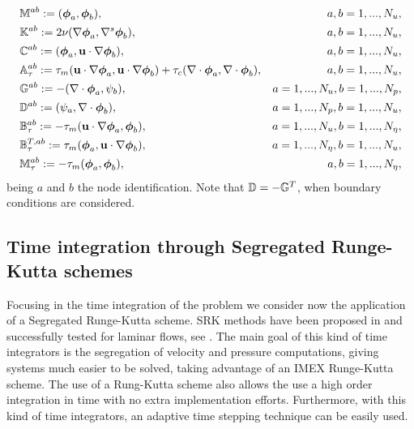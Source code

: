 \begin{align*}
&\mathbb{M}^{ab}:=(\boldsymbol{\phi}_{a},\boldsymbol{\phi}_{b}),&a,b=1,...,N_u,\\
&\mathbb{K}^{ab}:=2\nu(\nabla\boldsymbol{\phi}_{a},\nabla^s\boldsymbol{\phi}_{b}),&a,b=1,...,N_u,\\
&\mathbb{C}^{ab}:=(\boldsymbol{\phi}_{a},{\bf u}\cdot\nabla\boldsymbol{\phi}_{b}),&a,b=1,...,N_u,\\
&\mathbb{A}_{\tau}^{ab}:=\tau_m({\bf u}\cdot\nabla\boldsymbol{\phi}_{a},{\bf u}\cdot\nabla\boldsymbol{\phi}_{b})+\tau_c(\nabla\cdot\boldsymbol{\phi}_{a},\nabla\cdot\boldsymbol{\phi}_{b}),&a,b=1,...,N_u,\\
&\mathbb{G}^{ab}:=-(\nabla\cdot\boldsymbol{\phi}_{a},\psi_{b}),&a=1,...,N_u,b=1,...,N_p,\\
&\mathbb{D}^{ab}:=(\psi_{a},\nabla\cdot\boldsymbol{\phi}_{b}),&a=1,...,N_p,b=1,...,N_u,\\
&\mathbb{B}_{\tau}^{ab}:=-\tau_m({\bf u}\cdot\nabla\boldsymbol{\phi}_{a},\boldsymbol{\phi}_{b}),&a=1,...,N_u,b=1,...,N_\eta,\\
&\mathbb{B}_{\tau}^{T,ab}:=\tau_m(\boldsymbol{\phi}_{a},{\bf u}\cdot\nabla\boldsymbol{\phi}_{b}),&a=1,...,N_\eta,b=1,...,N_u,\\
&\mathbb{M}_{\tau}^{ab}:=-\tau_m(\boldsymbol{\phi}_{a},\boldsymbol{\phi}_{b}),&a,b=1,...,N_\eta,
\end{align*}
being $a$ and $b$ the node identification. Note that $\mathbb{D}=-\mathbb{G}^T$, when boundary conditions are considered.

\subsection{Time integration through Segregated Runge-Kutta schemes}
\label{subsec:C7_SRK}
Focusing in the time integration of the problem  we consider now the application of a Segregated Runge-Kutta scheme. SRK methods have been proposed in \cite{colomes_segregated_2015} and successfully tested for laminar flows, see . The main goal of this kind of time integrators is the segregation of velocity and pressure computations, giving systems much easier to be solved, taking advantage of an IMEX Runge-Kutta scheme. The use of a Rung-Kutta scheme also allows the use a high order integration in time with no extra implementation efforts. Furthermore, with this kind of time integrators, an adaptive time stepping technique can be easily used.

